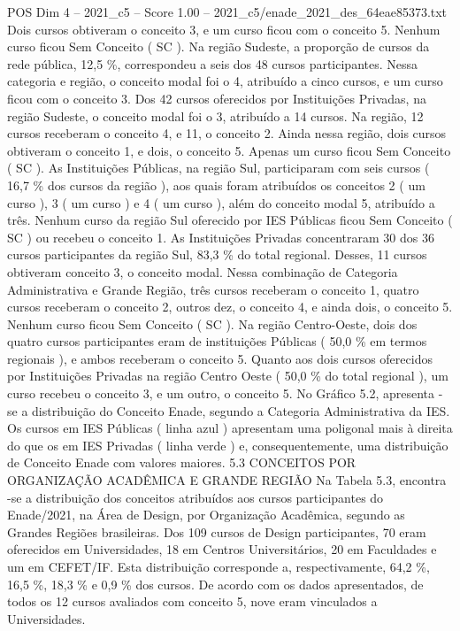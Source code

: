 \begin{textsample}{POS Dim 4 – 2021\_c5 – Score 1.00 – 2021\_c5/enade\_2021\_des\_64eae85373.txt}
Dois cursos obtiveram o conceito 3, e um curso ficou com o conceito 5.
Nenhum curso ficou Sem Conceito ( SC ).
Na região Sudeste, a proporção de cursos da rede pública, 12,5 \%, correspondeu a seis dos 48 cursos participantes.
Nessa categoria e região, o conceito modal foi o 4, atribuído a cinco cursos, e um curso ficou com o conceito 3.
Dos 42 cursos oferecidos por Instituições Privadas, na região Sudeste, o conceito modal foi o 3, atribuído a 14 cursos.
Na região, 12 cursos receberam o conceito 4, e 11, o conceito 2.
Ainda nessa região, dois cursos obtiveram o conceito 1, e dois, o conceito 5.
Apenas um curso ficou Sem Conceito ( SC ).
As Instituições Públicas, na região Sul, participaram com seis cursos ( 16,7 \% dos cursos da região ), aos quais foram atribuídos os conceitos 2 ( um curso ), 3 ( um curso ) e 4 ( um curso ), além do conceito modal 5, atribuído a três.
Nenhum curso da região Sul oferecido por IES Públicas ficou Sem Conceito ( SC ) ou recebeu o conceito 1.
As Instituições Privadas concentraram 30 dos 36 cursos participantes da região Sul, 83,3 \% do total regional.
Desses, 11 cursos obtiveram conceito 3, o conceito modal.
Nessa combinação de Categoria Administrativa e Grande Região, três cursos receberam o conceito 1, quatro cursos receberam o conceito 2, outros dez, o conceito 4, e ainda dois, o conceito 5.
Nenhum curso ficou Sem Conceito ( SC ).
Na região Centro-Oeste, dois dos quatro cursos participantes eram de instituições Públicas ( 50,0 \% em termos regionais ), e ambos receberam o conceito 5.
Quanto aos dois cursos oferecidos por Instituições Privadas na região Centro Oeste ( 50,0 \% do total regional ), um curso recebeu o conceito 3, e um outro, o conceito 5.
No Gráfico 5.2, apresenta -se a distribuição do Conceito Enade, segundo a Categoria Administrativa da IES.
Os cursos em IES Públicas ( linha azul ) apresentam uma poligonal mais à direita do que os em IES Privadas ( linha verde ) e, consequentemente, uma distribuição de Conceito Enade com valores maiores. 5.3 CONCEITOS POR ORGANIZAÇÃO ACADÊMICA E GRANDE REGIÃO Na Tabela 5.3, encontra -se a distribuição dos conceitos atribuídos aos cursos participantes do Enade/2021, na Área de Design, por Organização Acadêmica, segundo as Grandes Regiões brasileiras.
Dos 109 cursos de Design participantes, 70 eram oferecidos em Universidades, 18 em Centros Universitários, 20 em Faculdades e um em CEFET/IF.
Esta distribuição corresponde a, respectivamente, 64,2 \%, 16,5 \%, 18,3 \% e 0,9 \% dos cursos.
De acordo com os dados apresentados, de todos os 12 cursos avaliados com conceito 5, nove eram vinculados a Universidades.

\end{textsample}
